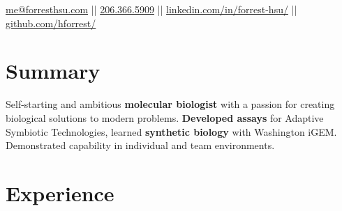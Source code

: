 \documentclass[]{forrest-resume-interfont}
\begin{document}
%
%

\lastupdated

%
%


%
%

{
	\href{mailto:me@forresthsu.com}{me@forresthsu.com} || 
	\href{tel:2063665909}{206.366.5909} || 
	\href{https://www.linkedin.com/in/forrest-hsu/}{linkedin.com/in/forrest-hsu/} ||
	\href{https://github.com/HForrest/}{github.com/hforrest/}
}

%
%
\spacesep
\section{ Summary}
\raggedright 

Self-starting and ambitious \textbf{molecular biologist} with a passion for creating biological solutions to modern problems. \textbf{Developed assays} for Adaptive Symbiotic Technologies, learned \textbf{synthetic biology} with Washington iGEM. Demonstrated capability in individual and team environments.

\linesep



\section{ Experience}
\\
\end{document}
